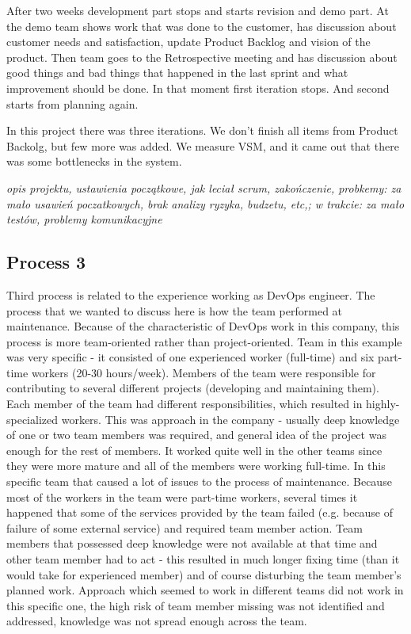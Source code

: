 After two weeks development part stops and starts revision and demo part. At the demo team shows work that was done to the customer, has discussion about customer needs and satisfaction, update Product Backlog and vision of the product. Then team goes to the Retrospective meeting and has discussion about good things and bad things that happened in the last sprint and what improvement should be done. In that moment first iteration stops. And second starts from planning again.

In this project there was three iterations. We don't finish all items from Product Backolg, but few more was added. We measure VSM, and it came out that there was some bottlenecks in the system. 

\textit{opis projektu, ustawienia początkowe, jak leciał scrum, zakończenie, probkemy: za mało usawień poczatkowych, brak analizy ryzyka, budzetu, etc,; w trakcie: za mało testów, problemy komunikacyjne}

\subsection*{Process 3}

Third process is related to the experience working as DevOps engineer. The process that we wanted to discuss here is how the team performed at maintenance. Because of the characteristic of DevOps work in this company, this process is more team-oriented rather than project-oriented. Team in this example was very specific - it consisted of one experienced worker (full-time) and six part-time workers (20-30 hours/week). Members of the team were responsible for contributing to several different projects (developing and maintaining them). Each member of the team had different responsibilities, which resulted in highly-specialized workers. This was approach in the company - usually deep knowledge of one or two team members was required, and general idea of the project was enough for the rest of members. It worked quite well in the other teams since they were more mature and all of the members were working full-time. In this specific team that caused a lot of issues to the process of maintenance. Because most of the workers in the team were part-time workers, several times it happened that some of the services provided by the team failed (e.g. because of failure of some external service) and required team member action. Team members that possessed deep knowledge were not available at that time and other team member had to act - this resulted in much longer fixing time (than it would take for experienced member) and of course disturbing the team member's planned work. Approach which seemed to work in different teams did not work in this specific one, the high risk of team member missing was not identified and addressed, knowledge was not spread enough across the team.
